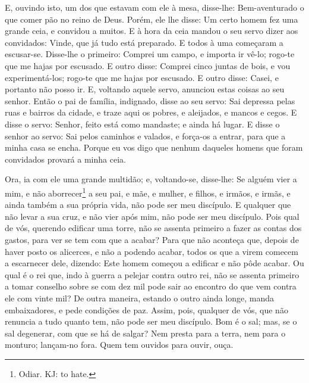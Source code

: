 E, ouvindo isto, um dos que estavam com ele à mesa, disse-lhe:
Bem-aventurado o que comer pão no reino de Deus. Porém, ele
lhe disse: Um certo homem fez uma grande ceia, e convidou a muitos.
E à hora da ceia mandou o seu servo dizer aos convidados:
Vinde, que já tudo está preparado. E todos à uma começaram a
escusar-se. Disse-lhe o primeiro: Comprei um campo, e importa ir
vê-lo; rogo-te que me hajas por escusado. E outro disse:
Comprei cinco juntas de bois, e vou experimentá-los; rogo-te que me
hajas por escusado. E outro disse: Casei, e portanto não
posso ir. E, voltando aquele servo, anunciou estas coisas ao
seu senhor. Então o pai de família, indignado, disse ao seu servo:
Sai depressa pelas ruas e bairros da cidade, e traze aqui os pobres,
e aleijados, e mancos e cegos. E disse o servo: Senhor, feito
está como mandaste; e ainda há lugar. E disse o senhor ao
servo: Sai pelos caminhos e valados, e força-os a entrar, para que a
minha casa se encha. Porque eu vos digo que nenhum daqueles
homens que foram convidados provará a minha ceia.

Ora, ia com ele uma grande multidão; e, voltando-se, disse-lhe:
Se alguém vier a mim, e não aborrecer\footnote{Odiar. KJ: to
hate.} a seu pai, e mãe, e mulher, e filhos, e irmãos, e irmãs, e
ainda também a sua própria vida, não pode ser meu discípulo.
E qualquer que não levar a sua cruz, e não vier após mim, não
pode ser meu discípulo. Pois qual de vós, querendo edificar
uma torre, não se assenta primeiro a fazer as contas dos gastos,
para ver se tem com que a acabar? Para que não aconteça que,
depois de haver posto os alicerces, e não a podendo acabar, todos os
que a virem comecem a escarnecer dele, dizendo: Este homem
começou a edificar e não pôde acabar. Ou qual é o rei que,
indo à guerra a pelejar contra outro rei, não se assenta primeiro a
tomar conselho sobre se com dez mil pode sair ao encontro do que vem
contra ele com vinte mil? De outra maneira, estando o outro
ainda longe, manda embaixadores, e pede condições de paz.
Assim, pois, qualquer de vós, que não renuncia a tudo quanto
tem, não pode ser meu discípulo. Bom é o sal; mas, se o sal
degenerar, com que se há de salgar? Nem presta para a terra,
nem para o monturo; lançam-no fora. Quem tem ouvidos para ouvir,
ouça.

\medskip

